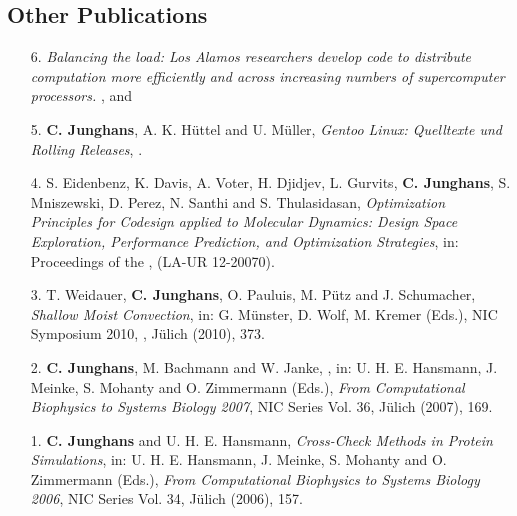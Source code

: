 \documentclass{article}
\begin{document}
\subsection*{Other Publications}

\begin{enumerate}
\item[6.] \textit{Balancing the load: Los Alamos researchers develop code to distribute computation more efficiently and across increasing numbers of supercomputer processors.}
  ,  and 

\item[5.] \textbf{C. Junghans}, A. K. H{\"u}ttel and U. M{\"u}ller, 
  \textit{Gentoo Linux: Quelltexte und Rolling Releases},
  .

\item[4.] S. Eidenbenz, K. Davis, A. Voter, H. Djidjev, L. Gurvits, \textbf{C. Junghans}, S. Mniszewski, D. Perez, N. Santhi and S. Thulasidasan,
  \textit{Optimization Principles for Codesign applied to Molecular Dynamics: Design Space Exploration, Performance Prediction, and Optimization Strategies},
  in: Proceedings of the , (LA-UR 12-20070). 

\item[3.] T. Weidauer, \textbf{C. Junghans}, O. Pauluis, M. P{\"u}tz and J. Schumacher,
  \textit{Shallow Moist Convection},
  in: G. M{\"u}nster, D. Wolf, M. Kremer (Eds.),
  NIC Symposium 2010, , J{\"u}lich (2010), 373.

\item[2.] \textbf{C. Junghans}, M. Bachmann and W. Janke,
  \textit{},
  in: U. H. E. Hansmann, J. Meinke, S. Mohanty and O. Zimmermann (Eds.),
  \textit{From Computational Biophysics to Systems Biology 2007}, NIC Series Vol. 36, J{\"u}lich (2007), 169.

\item[1.] \textbf{C. Junghans} and U. H. E. Hansmann,
  \textit{Cross-Check Methods in Protein Simulations},
  in: U. H. E. Hansmann, J. Meinke, S. Mohanty and O. Zimmermann (Eds.),
  \textit{From Computational Biophysics to Systems Biology 2006},
  NIC Series Vol. 34, J{\"u}lich (2006), 157.
\end{enumerate}
\end{document}
